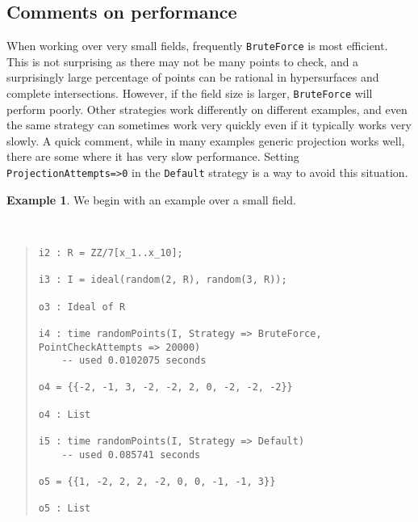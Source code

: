 \documentclass[11pt]{amsart}
\theoremstyle{definition}
\newtheorem{example}{Example}[section]
\begin{document}
    \subsection{Comments on performance}

    When working over very small fields, frequently {\tt BruteForce} is most efficient.  This is not surprising as there may not be many points to check, and a surprisingly large percentage of points can be rational in hypersurfaces and complete intersections.  However, if the field size is larger, {\tt BruteForce} will perform poorly.  Other strategies work differently on different examples, and even the same strategy can sometimes work very quickly even if it typically works very slowly.  A quick comment, while in many examples generic projection works well, there are some where it has very slow performance.  Setting {\tt ProjectionAttempts=>0} in the {\tt Default} strategy is a way to avoid this situation.


    \begin{example}
        We begin with an example over a small field.
    {{\small\color{blue}
    ~~
    \begin{quote}
\begin{verbatim}
i2 : R = ZZ/7[x_1..x_10];

i3 : I = ideal(random(2, R), random(3, R));

o3 : Ideal of R

i4 : time randomPoints(I, Strategy => BruteForce, PointCheckAttempts => 20000)
    -- used 0.0102075 seconds

o4 = {{-2, -1, 3, -2, -2, 2, 0, -2, -2, -2}}

o4 : List

i5 : time randomPoints(I, Strategy => Default)
    -- used 0.085741 seconds

o5 = {{1, -2, 2, 2, -2, 0, 0, -1, -1, 3}}

o5 : List
    \end{verbatim}
\end{quote}\vspace{-1em}
    }}
    \end{example}    
\end{document}

